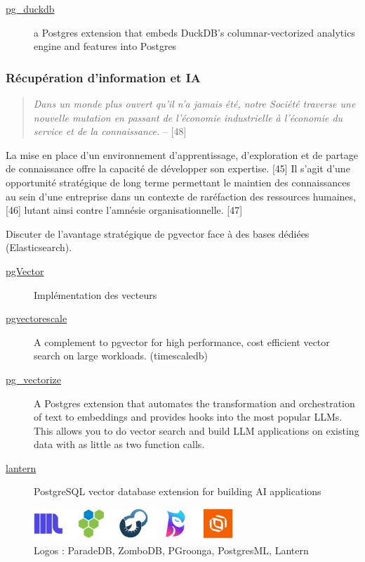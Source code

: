 \documentclass[a4paper,12pt]{article}
\begin{document}
\begin{multicols*}{2}
\begin{description}
\item[{\href{https://github.com/duckdb/pg\_duckdb}{pg\_duckdb}}] a Postgres extension that embeds DuckDB's columnar-vectorized analytics engine and features into Postgres
\end{description}
\subsubsection*{Récupération d'information et IA}
\label{sec:orgbcbe5e9}
\begin{quote}
\emph{Dans un monde plus ouvert qu’il n’a jamais été, notre Société traverse une nouvelle mutation en passant de l’économie industrielle à l’économie du service et de la connaissance.} -- [48]
\end{quote}

La mise en place d’un environnement d’apprentissage, d’exploration et de partage de connaissance offre la capacité de développer son expertise. [45] Il s’agit d’une opportunité stratégique de long terme permettant le maintien des connaissances au sein d’une entreprise dans un contexte de raréfaction des ressources humaines, [46] lutant ainsi contre l’amnésie organisationnelle. [47] 

Discuter de l’avantage stratégique de pgvector face à des bases dédiées (Elasticsearch).

\begin{description}
\item[{\href{https://github.com/pgvector/pgvector}{pgVector}}] Implémentation des vecteurs
\item[{\href{https://github.com/timescale/pgvectorscale}{pgvectorescale}}] A complement to pgvector for high performance, cost efficient vector search on large workloads. (timescaledb)
\item[{\href{https://github.com/tembo-io/pg\_vectorize}{pg\_vectorize}}] A Postgres extension that automates the transformation and orchestration of text to embeddings and provides hooks into the most popular LLMs. This allows you to do vector search and build LLM applications on existing data with as little as two function calls.
\item[{\href{https://github.com/lanterndata/lantern}{lantern}}] PostgreSQL vector database extension for building AI applications
\end{description}

\begin{figure}[H]
\centering
\includegraphics[height=1.2cm]{icons/pg-search.pdf}
\caption{\label{fig:orge5880aa}Logos : ParadeDB, ZomboDB, PGroonga, PostgresML, Lantern}
\end{figure}



\end{multicols*}
\end{document}
